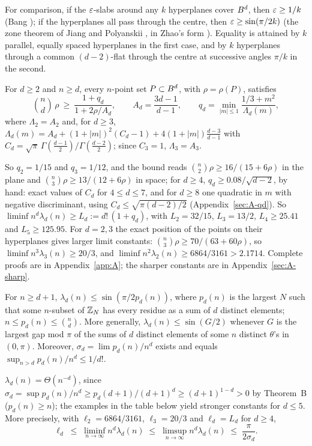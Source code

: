 \documentclass[11pt]{article}
\begin{document}
For comparison, if the $\varepsilon$-slabs around any $k$ hyperplanes cover $B^d$, then $\varepsilon\ge1/k$ (Bang
\cite{Bang}); if the hyperplanes all pass through the centre, then $\varepsilon\ge\sin(\pi/2k)$ (the zone theorem
of Jiang and Polyanskii \cite{JP}, in Zhao's form \cite{Zhao}). Equality is attained by $k$ parallel,
equally spaced hyperplanes in the first case, and by $k$ hyperplanes through a common $(d-2)$-flat
through the centre at successive angles $\pi/k$ in the second.

\begin{thmA}
For $d\ge2$ and $n\ge d$, every $n$-point set $P\subset B^d$, with $\rho=\rho(P)$, satisfies
\[
\binom nd\,\rho\ \ge\ \frac{1+q_d}{1+2\rho/A_d},\qquad A_d=\frac{3d-1}{d-1},\qquad
q_d=\min_{|m|\le1}\frac{1/3+m^2}{\Lambda_d(m)},
\]
where $\Lambda_2=A_2$ and, for $d\ge3$,
$\Lambda_d(m)=A_d+(1+|m|)^2(C_d-1)+4(1+|m|)\tfrac{d-3}{d-1}$
with $C_d=\sqrt\pi\,\Gamma(\tfrac{d-1}2)/\Gamma(\tfrac{d-2}2)$; since $C_3=1$, $\Lambda_3=A_3$.
\end{thmA}

So $q_2=1/15$ and $q_3=1/12$, and the bound reads $\binom n2\rho\ge 16/(15+6\rho)$ in the plane and
$\binom n3\rho\ge 13/(12+6\rho)$ in space; for $d\ge4$, $q_d\ge0.08/\sqrt{d-2}$, by hand: exact values of
$C_d$ for $4\le d\le7$, and for $d\ge8$ one quadratic in $m$ with negative discriminant, using
$C_d\le\sqrt{\pi(d-2)/2}$ (Appendix~\ref{sec:A-qd}). So
$\liminf n^d\lambda_d(n)\ge L_d:=d!\,(1+q_d)$, with $L_2=32/15$, $L_3=13/2$, $L_4\ge25.41$ and
$L_5\ge125.95$. For $d=2,3$ the exact position of the points on their hyperplanes gives larger limit constants:
$\binom n3\rho\ge70/(63+60\rho)$, so $\liminf n^3\lambda_3(n)\ge20/3$, and
$\liminf n^2\lambda_2(n)\ge6864/3161>2.1714$. Complete proofs are in Appendix~\ref{app:A}; the sharper
constants are in Appendix~\ref{sec:A-sharp}.

\begin{thmB}
For $n\ge d+1$, $\lambda_d(n)\le\sin(\pi/2p_d(n))$, where $p_d(n)$ is the largest $N$ such that some
$n$-subset of $\mathbb{Z}_N$ has every residue as a sum of $d$ distinct elements; $n\le p_d(n)\le\binom nd$.
More generally, $\lambda_d(n)\le\sin(G/2)$ whenever $G$ is the largest gap mod $\pi$ of the sums of $d$
distinct elements of some $n$ distinct $\theta$'s in $(0,\pi)$. Moreover,
$\sigma_d=\lim p_d(n)/n^d$ exists and equals $\sup_{n>d}p_d(n)/n^d\le 1/d!$.
\end{thmB}

\begin{corC}
$\lambda_d(n)=\Theta(n^{-d})$, since $\sigma_d=\sup p_d(n)/n^d\ge p_d(d+1)/(d+1)^d\ge(d+1)^{1-d}>0$ by
Theorem~B ($p_d(n)\ge n$); the examples in the table below yield stronger constants for $d\le5$. More
precisely, with $\ell_2=6864/3161$, $\ell_3=20/3$ and $\ell_d=L_d$ for $d\ge4$,
\[
\ell_d\;\le\;\liminf_{n\to\infty}n^d\lambda_d(n)\;\le\;\limsup_{n\to\infty}n^d\lambda_d(n)\;\le\;
\frac{\pi}{2\sigma_d}.
\]
\end{corC}
\end{document}
